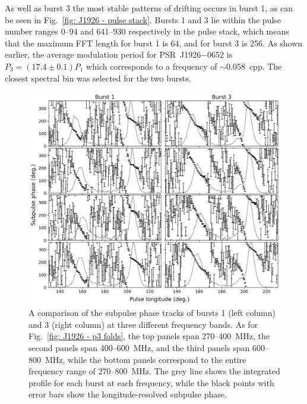 
As well as burst 3 the most stable patterns of drifting occurs in burst 1, as can be seen in Fig.~\ref{fig: J1926 - pulse stack}. Bursts 1 and 3 lie within the pulse number ranges 0--94 and 641--930 respectively in the pulse stack, which means that the maximum FFT length for burst 1 is 64, and for burst 3 is 256. As shown earlier, the average modulation period for PSR~J1926$-$0652 is $P_3 = (17.4 \pm 0.1)P_1$ which corresponds to a frequency of $\sim$0.058~cpp. The closest spectral bin was selected for the two bursts.

\begin{figure}
    \begin{center}
        \includegraphics[width=1.0\textwidth]{Figures/J1926/subpulse_phase}
        \caption[Subpulse phase tracks PSR~J1926$-$0652]{A comparison of the subpulse phase tracks of bursts 1 (left column) and 3 (right column) at three different frequency bands. As for Fig.~\ref{fig: J1926 - p3 folds}, the top panels span 270--400~MHz, the second panels span 400--600~MHz, and the third panels span 600--800~MHz, while the bottom panels correspond to the entire frequency range of 270--800~MHz. The grey line shows the integrated profile for each burst at each frequency, while the black points with error bars show the longitude-resolved subpulse phase.}
        \label{fig: J1926 - phase tracks}
    \end{center}
\end{figure}

